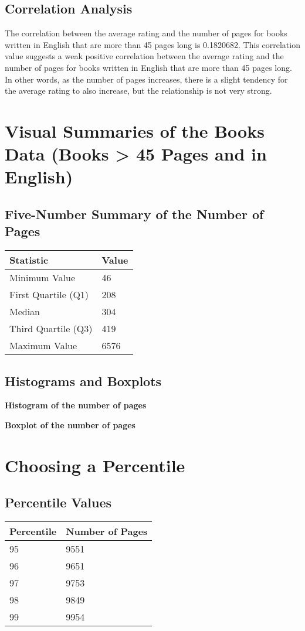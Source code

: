 \documentclass[12pt]{article}
\begin{document}
\subsection*{Correlation Analysis}
The correlation between the average rating and the number of pages for books written in English that are more than 45 pages long is 0.1820682. This correlation value suggests a weak positive correlation between the average rating and the number of pages for books written in English that are more than 45 pages long. In other words, as the number of pages increases, there is a slight tendency for the average rating to also increase, but the relationship is not very strong.

\section*{Visual Summaries of the Books Data (Books > 45 Pages and in English)}
\subsection*{Five-Number Summary of the Number of Pages}
\begin{tabular}{l l}
    \toprule
    \textbf{Statistic} & \textbf{Value} \\
    \midrule
    Minimum Value & 46 \\
    First Quartile (Q1) & 208 \\
    Median & 304 \\
    Third Quartile (Q3) & 419 \\
    Maximum Value & 6576 \\
    \bottomrule
\end{tabular}

\subsection*{Histograms and Boxplots}
\textbf{Histogram of the number of pages}

\textbf{Boxplot of the number of pages}

\section*{Choosing a Percentile}
\subsection*{Percentile Values}
\begin{tabular}{l l}
    \toprule
    \textbf{Percentile} & \textbf{Number of Pages} \\
    \midrule
    95 & 9551 \\
    96 & 9651 \\
    97 & 9753 \\
    98 & 9849 \\
    99 & 9954 \\
    \bottomrule
\end{tabular}
\end{document}
